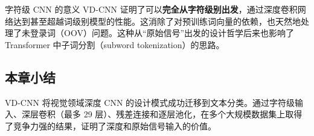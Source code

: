 \begin{importantbox}{字符级 CNN 的意义}
VD-CNN 证明了可以\textbf{完全从字符级别出发}，通过深度卷积网络达到甚至超越词级别模型的性能。这消除了对预训练词向量的依赖，也天然地处理了未登录词（OOV）问题。这种从``原始信号''出发的设计哲学后来也影响了 Transformer 中子词分割（subword tokenization）的思路。
\end{importantbox}

\subsection{本章小结}

VD-CNN 将视觉领域深度 CNN 的设计模式成功迁移到文本分类。通过字符级输入、深层卷积（最多 29 层）、残差连接和逐层池化，在多个大规模数据集上取得了竞争力强的结果，证明了深度和原始信号输入的价值。


